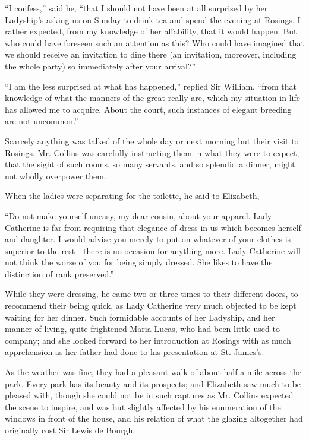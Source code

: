 \documentclass[12pt,openright]{book}
\begin{document}
“I confess,” said he, “that I should not have been at all surprised by her Ladyship’s asking us on Sunday to drink tea and spend the evening at Rosings. I rather expected, from my knowledge of her affability, that it would happen. But who could have foreseen such an attention as this? Who could have imagined that we should receive an invitation to dine there (an invitation, moreover, including the whole party) so immediately after your arrival?”

“I am the less surprised at what has happened,” replied Sir William, “from that knowledge of what the manners of the great really are, which my situation in life has allowed me to acquire. About the court, such instances of elegant breeding are not uncommon.”

Scarcely anything was talked of the whole day or next morning but their visit to Rosings. Mr. Collins was carefully instructing them in what they were to expect, that the sight of such rooms, so many servants, and so splendid a dinner, might not wholly overpower them.

When the ladies were separating for the toilette, he said to Elizabeth,—

“Do not make yourself uneasy, my dear cousin, about your apparel. Lady Catherine is far from requiring that elegance of dress in us which becomes herself and daughter. I would advise you merely to put on whatever of your clothes is superior to the rest—there is no occasion for anything more. Lady Catherine will not think the worse of you for being simply dressed. She likes to have the distinction of rank preserved.”

While they were dressing, he came two or three times to their different doors, to recommend their being quick, as Lady Catherine very much objected to be kept waiting for her dinner. Such formidable accounts of her Ladyship, and her manner of living, quite frightened Maria Lucas, who had been little used to company; and she looked forward to her introduction at Rosings with as much apprehension as her father had done to his presentation at St. James’s.

As the weather was fine, they had a pleasant walk of about half a mile across the park. Every park has its beauty and its prospects; and Elizabeth saw much to be pleased with, though she could not be in such raptures as Mr. Collins expected the scene to inspire, and was but slightly affected by his enumeration of the windows in front of the house, and his relation of what the glazing altogether had originally cost Sir Lewis de Bourgh.
\end{document}
